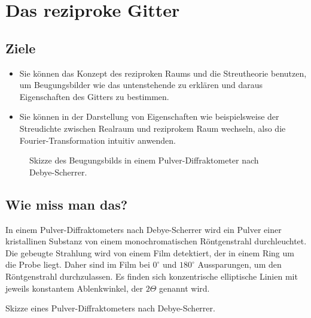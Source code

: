 
\chapter{Das reziproke Gitter}





\section{Ziele}

\begin{itemize}
\item Sie können das Konzept des reziproken Raums und die Streutheorie benutzen, um Beugungsbilder wie das untenstehende zu erklären und daraus Eigenschaften des Gitters zu bestimmen.

\item Sie können in der Darstellung von Eigenschaften wie beispielsweise der Streudichte zwischen Realraum und reziprokem Raum wechseln, also die Fourier-Transformation intuitiv anwenden.
\end{itemize}


\begin{figure}
  \caption{Skizze des Beugungsbilds in einem Pulver-Diffraktometer nach Debye-Scherrer.}
\end{figure}




\section{Wie miss man das?}






In einem  Pulver-Diffraktometers  nach Debye-Scherrer wird ein Pulver einer kristallinen Substanz von einem monochromatischen Röntgenstrahl durchleuchtet. Die gebeugte Strahlung wird von einem Film detektiert, der in einem Ring um die Probe liegt. Daher sind im Film bei $0^\circ$ und $180^\circ$ Aussparungen, um den Röntgenstrahl durchzulassen. Es finden sich konzentrische elliptische Linien mit jeweils konstantem Ablenkwinkel, der $2\Theta$ genannt wird.

\begin{marginfigure}
  \caption{Skizze  eines Pulver-Diffraktometers nach Debye-Scherrer.}
\end{marginfigure}

